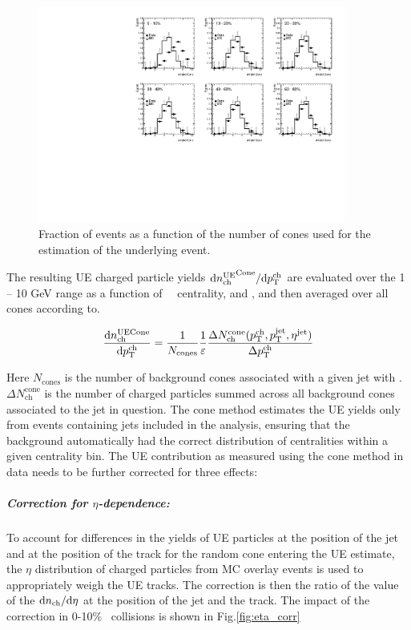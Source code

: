 \begin{figure}[ht]
     \centerline{
        \includegraphics[width=0.9\textwidth]{figures_UE/cone_stats}
     }
     \caption{Fraction of events as a function of the number of cones used for the estimation of the underlying event.}
     \label{fig:cone_stats}
  \end{figure}   

The resulting UE charged particle yields $\mathrm{d} \mbox{$n_{\mathrm{ch}}^{\mathrm{UE}}$}^{\mathrm{Cone}}/ \mathrm{d} \mbox{$p_{{\mathrm{T}}}^{\mathrm{ch}}$}$ are evaluated over the 1 -- 10 GeV range as a function of \pt\, \ptjet\, centrality, and \rvar, and then averaged over all cones according to.

 \begin{eqnarray}
 \label{eq:Dptsub}
\frac{\fd n_{\mathrm{ch}}^{\mathrm{UE Cone}}}{\fd \pTch}  = \frac{1}{N_{\mathrm{cones}}} \frac{1}{\varepsilon} \frac{\Delta N^{\mathrm{cone}}_{\mathrm{ch}} (\pTch, \ptjet, \etajet)}{\Delta \pTch}
 \end{eqnarray}

Here $N_{\mathrm{cones}}$ is the number of background cones associated with a given jet with \ptjet. $\Delta N^{\mathrm{cone}}_{\mathrm{ch}}$ is the number of charged particles summed across all background cones associated to the jet in question. The cone method estimates the UE yields only from events containing jets included in the analysis, ensuring that the background automatically had the correct distribution of centralities within a given centrality bin. The UE contribution as measured using the cone method in data needs to be further corrected for three effects:
 \subparagraph{Correction for $\eta$-dependence: } To account for differences in the yields of UE particles at the position of the jet and at the position of the track for the random cone entering the UE estimate, the $\eta$ distribution of charged particles from MC overlay events is used to appropriately weigh the UE tracks. The correction is then the ratio of the value of the $\fd \nch / \fd\eta$ at the position of the jet and the track. The impact of the correction in 0-10\% \pbpb\ collisions is shown in Fig.\ref{fig:eta_corr}

